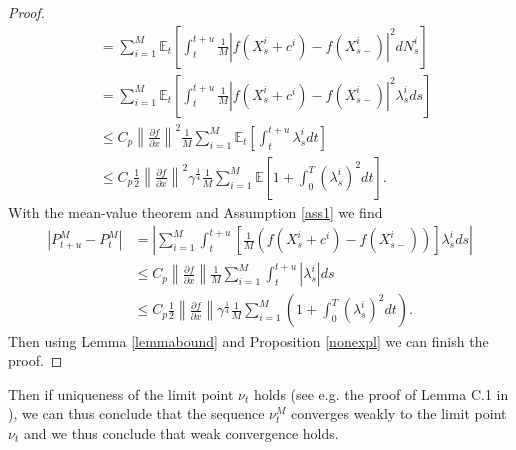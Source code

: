 \documentclass[10pt]{article}
\theoremstyle{plain}
\theoremstyle{definition}
\newcommand{\<}{\langle}
\renewcommand{\>}{\rangle}
\renewcommand{\(}{\left(}
\renewcommand{\)}{\right)}
\renewcommand{\[}{\left[}
\renewcommand{\]}{\right]}
\begin{document}
\begin{proof}
\begin{align}
&=\sum\limits_{i=1}^M\mathbb{E}_t\left[\int_t^{t+u}\frac{1}{M}\left|f(X_s^i+c^i)-f(X_{s-}^i)\right|^2dN_s^i\right]\\
&=\sum\limits_{i=1}^M\mathbb{E}_t\left[\int_t^{t+u}\frac{1}{M}\left|f(X_s^i+c^i)-f(X_{s-}^i)\right|^2\lambda^i_sds\right]\\
&\leq C_p\left\|\frac{\partial f}{\partial
x}\right\|^2\frac{1}{M}\sum\limits_{i=1}^M\mathbb{E}_t\left[\int_t^{t+u}\lambda^i_sdt\right]\\
&\leq C_p\frac{1}{2}\left\|\frac{\partial f}{\partial
x}\right\|^2\gamma^{\frac{1}{4}}\frac{1}{M}\sum\limits_{i=1}^M\mathbb{E}\left[1+\int_0^{T}(\lambda^i_s)^2dt\right].
\end{align}
With the mean-value theorem and Assumption \ref{ass1} we find
\begin{align}
\left|P_{t+u}^M-P_t^M\right|&=\left|\sum\limits_{i=1}^M\int_t^{t+u}\left[\frac{1}{M}(f(X_s^i+c^i)-f(X_{s-}^i))\right]\lambda_s^ids\right|\\
&\leq C_p\left\|\frac{\partial f}{\partial
x}\right\|\frac{1}{M}\sum\limits_{i=1}^M\int_t^{t+u}|\lambda^i_s|ds\\ &\leq
C_p\frac{1}{2}\left\|\frac{\partial f}{\partial
x}\right\|\gamma^{\frac{1}{4}}\frac{1}{M}\sum\limits_{i=1}^M\left(1+\int_0^{T}(\lambda^i_s)^2dt\right).
\end{align}
Then using Lemma \ref{lemmabound} and Proposition \ref{nonexpl} we can finish the proof.  %
\end{proof}

Then if uniqueness of the limit point $\nu_t$ holds (see e.g. the proof of Lemma C.1 in \cite{capponi15}), we can thus conclude that the sequence $\nu_t^M$ converges weakly to the limit point $\nu_t$ and we thus conclude that weak convergence holds.



\end{document}
